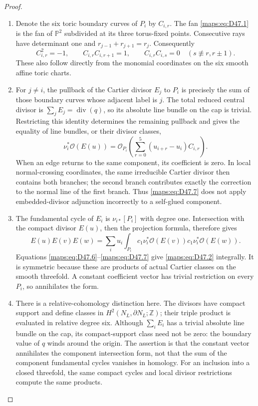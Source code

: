 \begin{proof}
\begin{enumerate}[label=\arabic*.,leftmargin=*]
\item Denote the six toric boundary curves of $P_i$ by $C_{i,r}$.
The fan \eqref{maps:eq:D47.1} is the fan of $\mathbb P^2$ subdivided
at its three torus-fixed points. Consecutive rays have
determinant one and $r_{j-1}+r_{j+1}=r_j$. Consequently
\[
 C_{i,r}^2=-1,\qquad
 C_{i,r}C_{i,r+1}=1,\qquad
 C_{i,r}C_{i,s}=0\quad(s\not\equiv r,r\pm1).               \tag{D47.6}\label{maps:eq:D47.6}
\]
These also follow directly from the monomial coordinates
on the six smooth affine toric charts.

\item For $j\ne i$, the pullback of the Cartier divisor $E_j$
to $P_i$ is precisely the sum of those boundary curves
whose adjacent label is $j$. The total reduced central
divisor is $\sum_jE_j=\operatorname{div}(q)$, so its
absolute line bundle on the cap is trivial. Restricting
this identity determines the remaining pullback and gives
the equality of line bundles, or their divisor classes,
\[
 \nu_i^*\mathcal O(E(u))
       =\mathcal O_{P_i}\left(
                   \sum_{r=0}^5(u_{i+r}-u_i)C_{i,r}\right).
                                                               \tag{D47.7}\label{maps:eq:D47.7}
\]
When an edge returns to the same component, its coefficient
is zero. In local normal-crossing coordinates, the same
irreducible Cartier divisor then contains both branches;
the second branch contributes exactly the correction to
the normal line of the first branch. Thus \eqref{maps:eq:D47.7} does
not apply embedded-divisor adjunction incorrectly to a
self-glued component.

\item The fundamental cycle of $E_i$ is $\nu_{i*}[P_i]$ with
degree one. Intersection with the compact divisor $E(u)$,
then the projection formula, therefore gives
\[
 E(u)E(v)E(w)=\sum_i u_i
           \int_{P_i}c_1\nu_i^*\mathcal O(E(v))
                       c_1\nu_i^*\mathcal O(E(w)).          \tag{D47.8}\label{maps:eq:D47.8}
\]
Equations \eqref{maps:eq:D47.6}--\eqref{maps:eq:D47.7} give \eqref{maps:eq:D47.2} integrally.
It is symmetric because these are products of actual
Cartier classes on the smooth threefold. A constant
coefficient vector has trivial restriction on every
$P_i$, so annihilates the form.

\item There is a relative-cohomology distinction here. The
divisors have compact support and define classes in
$H^2(N_L,\partial N_L;\mathbb Z)$; their triple product
is evaluated in relative degree six. Although
$\sum_iE_i$ has a trivial absolute line bundle on the
cap, its compact-support class need not be zero: the
boundary value of $q$ winds around the origin.
The assertion is that the constant vector annihilates
the component intersection form, not that the sum of
the component fundamental cycles vanishes in homology.
For an inclusion into a closed threefold, the same
compact cycles and local divisor restrictions compute
the same products.


\end{enumerate}
\end{proof}
